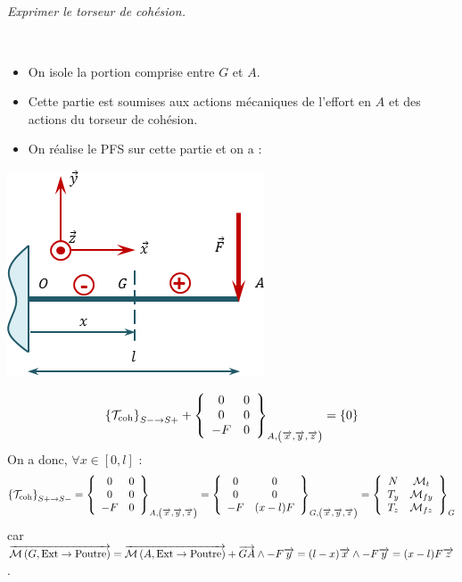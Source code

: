 \documentclass[10pt,fleqn]{article} %
\begin{document}
\begin{multicols}{1}
\subparagraph{}
\textit{Exprimer le torseur de cohésion.}
\ifprof
\begin{corrige} ~\\
\begin{minipage}[c]{.48\linewidth}
\begin{itemize}[label=,font=\color{ocre}] 
\item On isole la portion comprise entre $G$ et $A$.
\item Cette partie est soumises aux actions mécaniques de l'effort en $A$ et des actions du torseur de cohésion. 
\item On réalise le PFS sur cette partie et on a :
\end{itemize}
\end{minipage} \hfill
\begin{minipage}[c]{.48\linewidth}
\begin{center}
\includegraphics[width=.85\linewidth]{images/exo_01_01_corr_01}
\end{center}
\end{minipage} 

$$
\torseurscoh_{S-\rightarrow S+} + \torseurcol{0}{0}{-F}{0}{0}{0}{A,\left( \vect{x},\vect{y},\vect{z} \right)} = \{0\}
$$
On a donc, $\forall x \in\left[0,l\right]$ :
$$
\torseurscoh_{S+\rightarrow S-}
=\torseurcol{0}{0}{-F}{0}{0}{0}{A,\left( \vect{x},\vect{y},\vect{z} \right)}
=\torseurcol{0}{0}{-F}{0}{0}{(x-l) F}{G,\left( \vect{x},\vect{y},\vect{z} \right)}
=\torseurcol{N}{T_y}{T_z}{\mathcal{M}_t}{\mathcal{M}_{fy}}{\mathcal{M}_{fz}}{G}
$$
car $\vectm{G}{\text{Ext}}{\text{Poutre}}=\vectm{A}{\text{Ext}}{\text{Poutre}} + \vect{GA}\wedge - F \vect{y}  = (l-x)\vect{x} \wedge -F \vect{y} = (x-l) F \vect{z}$.


\end{corrige}
\end{multicols}
\end{document}
